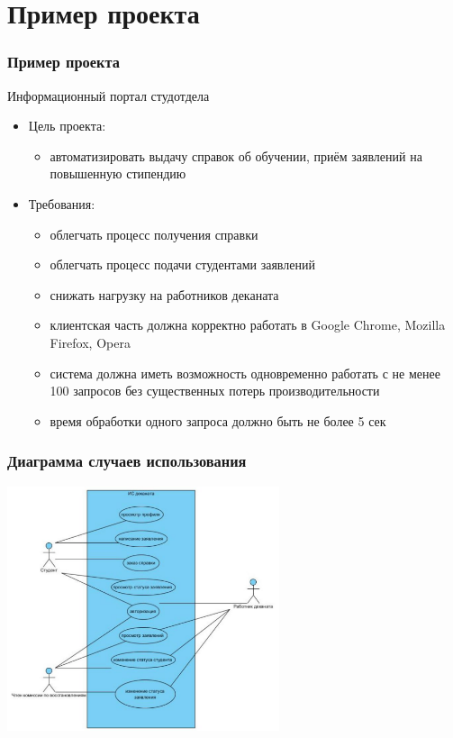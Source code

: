 \documentclass[xetex,mathserif,serif]{beamer}
\begin{document}
	\section{Пример проекта}

	\begin{frame}
		\frametitle{Пример проекта}
		Информационный портал студотдела
		\begin{itemize}
			\item Цель проекта:
			\begin{itemize}
				\item автоматизировать выдачу справок об обучении, приём заявлений на повышенную стипендию
			\end{itemize}
			\item Требования:
			\begin{itemize}
				\item облегчать процесс получения справки
				\item облегчать процесс подачи студентами заявлений
				\item снижать нагрузку на работников деканата
				\item клиентская часть должна корректно работать в Google Chrome, Mozilla Firefox, Opera
				\item система должна иметь возможность одновременно работать с не менее 100 запросов без существенных потерь производительности
				\item время обработки одного запроса должно быть не более 5 сек
			\end{itemize}
		\end{itemize}
	\end{frame}

	\begin{frame}
		\frametitle{Диаграмма случаев использования}
		\begin{center}
			\includegraphics[width=0.6\textwidth]{useCase.png}
		\end{center}
	\end{frame}
\end{document}
